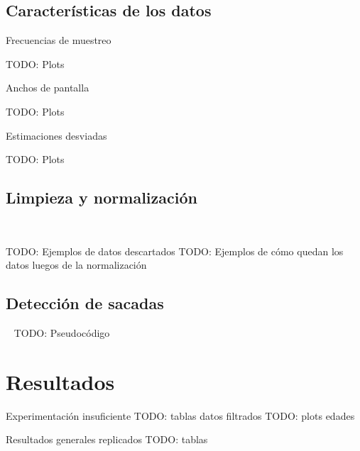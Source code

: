 \documentclass{beamer}
\begin{document}
\subsection{Características de los datos}

\begin{frame}{Frecuencias de muestreo}

TODO: Plots

\end{frame}

\begin{frame}{Anchos de pantalla}

TODO: Plots

\end{frame}

\begin{frame}{Estimaciones desviadas}

TODO: Plots

\end{frame}

\subsection{Limpieza y normalización}

\begin{frame}{~}

TODO: Ejemplos de datos descartados
TODO: Ejemplos de cómo quedan los datos luegos de la normalización

\end{frame}

\subsection{Detección de sacadas}

\begin{frame}{~}
TODO: Pseudocódigo
\end{frame}

\section{Resultados}

\begin{frame}{Experimentación insuficiente}
TODO: tablas datos filtrados
TODO: plots edades
\end{frame}

\begin{frame}{Resultados generales replicados}
TODO: tablas
\end{frame}
\end{document}
